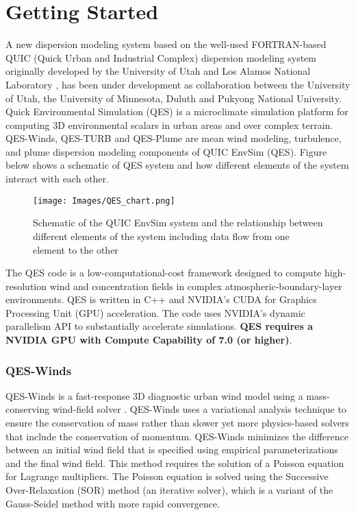 \section{Getting Started}

A new dispersion modeling system based on the well-used FORTRAN-based QUIC (Quick Urban and Industrial Complex) dispersion modeling system originally developed by the University of Utah and Los Alamos National Laboratory \cite{brown2013quic}, has been under development as collaboration between the University of Utah, the University of Minnesota, Duluth and Pukyong National University. Quick Environmental Simulation (QES) is a microclimate simulation platform for computing 3D environmental scalars in urban areas and over complex terrain. QES-Winds, QES-TURB and QES-Plume are mean wind modeling, turbulence, and plume dispersion modeling components of QUIC EnvSim (QES). Figure below shows a schematic of QES system and how different elements of the system interact with each other.

\begin{figure}[h!]
\texttt{[image: Images/QES\_chart.png]}
\centering
\caption{Schematic of the QUIC EnvSim system and the relationship between different elements of the system including data flow from one element to the other}
\end{figure}

The QES code is a low-computational-cost framework designed to compute high-resolution wind and concentration fields in complex atmospheric-boundary-layer environments. QES is written in C++ and NVIDIA's CUDA for Graphics Processing Unit (GPU) acceleration. The code uses NVIDIA's dynamic parallelism API to substantially accelerate simulations. \textbf{QES requires a NVIDIA GPU with Compute Capability of 7.0 (or higher)}.


\subsubsection{QES-Winds}

QES-Winds is a fast-response 3D diagnostic urban wind model using a mass-conserving wind-field solver \cite{Bozorgmehr2021}. QES-Winds uses a variational analysis technique to ensure the conservation of mass rather than slower yet more physics-based solvers that include the conservation of momentum. QES-Winds minimizes the difference between an initial wind field that is specified using empirical parameterizations and the final wind field. This method requires the solution of a Poisson equation for Lagrange multipliers. The Poisson equation is solved using the Successive Over-Relaxation (SOR) method (an iterative solver), which is a variant of the Gauss-Seidel method with more rapid convergence.

